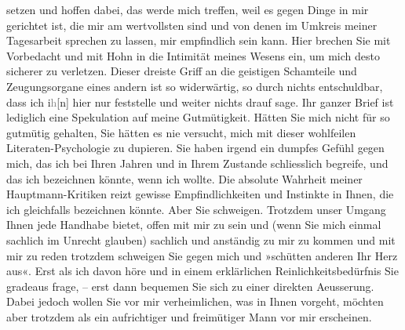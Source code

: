 \begin{ledgroupsized}[t]{13cm}
               setzen und hoffen dabei, das werde mich treffen, weil es gegen Dinge in mir gerichtet
               ist, die mir am wertvollsten sind und von denen im Umkreis meiner Tagesarbeit
               sprechen zu lassen, mir empfindlich sein kann. {\pb}Hier brechen Sie mit Vorbedacht
               und mit Hohn in die Intimität meines Wesens ein, um mich desto sicherer zu verletzen.
               Dieser dreiste Griff an die geistigen Schamteile und Zeugungsorgane eines andern ist
               so widerwärtig, so durch nichts entschuldbar, dass ich i\textcolor{gray}{h}{[}n{]} hier nur feststelle und weiter nichts drauf sage.\pend
           \pstart
           Ihr ganzer Brief ist lediglich eine Spekulation auf meine Gutmütigkeit. Hätten Sie
               mich nicht für so gutmütig gehalten, Sie hätten es nie versucht, mich mit dieser
               wohlfeilen Literaten-Psychologie zu dupieren.\pend
           \pstart
           Sie haben irgend ein dumpfes Gefühl gegen mich, das ich bei Ihren Jahren und in Ihrem
               Zustande schliesslich begreife, und das ich bezeichnen könnte, wenn ich wollte. Die
               absolute Wahrheit meiner Hauptmann-Kritiken reizt gewisse
               Empfindlichkeiten und Instinkte in Ihnen, die ich gleichfalls bezeichnen könnte.\pend
           \pstart
           Aber Sie schweigen. Trotzdem unser Umgang Ihnen jede Handhabe bietet, offen mit mir
               zu sein und (wenn Sie mich einmal sachlich im Unrecht glauben) sachlich und anständig
               zu mir zu kommen und mit mir zu reden {\dotstwo} trotzdem schweigen
               Sie gegen mich und »schütten anderen Ihr Herz aus«. Erst als ich davon höre und in
               einem erklärlichen Reinlichkeitsbedürfnis Sie gradeaus frage, – erst dann bequemen
               Sie sich zu einer direkten Aeusserung. Dabei jedoch wollen Sie vor mir verheimlichen,
               was in Ihnen vorgeht, möchten aber trotzdem als ein aufrichtiger und freimütiger Mann
               vor mir erscheinen.\pend
           \pstart

\end{ledgroupsized}

